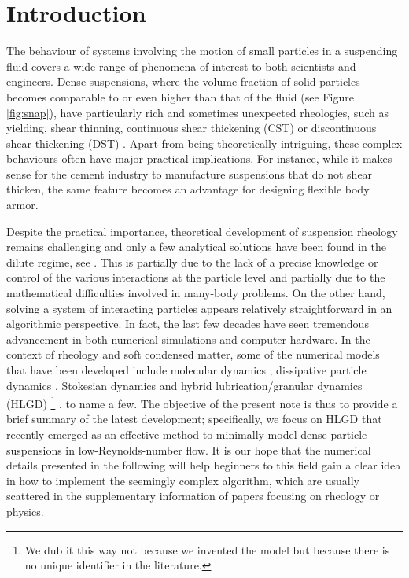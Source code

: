 
\section{Introduction}

The behaviour of systems involving the motion of small particles in a suspending fluid covers a wide range of phenomena of interest to both scientists and engineers. Dense suspensions, where the volume fraction of solid particles becomes comparable to or even higher than that of the fluid (see Figure \ref{fig:snap}), have particularly rich and sometimes unexpected rheologies, such as yielding, shear thinning, continuous shear thickening (CST) or discontinuous shear thickening (DST) \citep{mewis_wagner_book, Morton_Morris_2014, guazzelli_pouliquen_2018, Morris_annurev2020}. Apart from being theoretically intriguing, these complex behaviours often have major practical implications. For instance, while it makes sense for the cement industry to manufacture suspensions that do not shear thicken, the same feature becomes an advantage for designing flexible body armor.

Despite the practical importance, theoretical development of suspension rheology remains challenging and
only a few analytical solutions have been found in the dilute regime, see \eg \cite{Einstein_1906, batchelor_green_1972b}.
This is partially due to the lack of a precise knowledge or control of the various interactions at the particle level and
partially due to the mathematical difficulties involved in many-body problems.
On the other hand, solving a system of interacting particles appears relatively straightforward in an algorithmic perspective.
In fact, the last few decades have seen tremendous advancement in both numerical simulations and computer hardware.
In the context of rheology and soft condensed matter, some of the numerical models that have been developed include
molecular dynamics \citep{Alder_Wainwright_1959,Verlet1967},
dissipative particle dynamics \citep{Hoogerbrugge_1992, Groot_Warren_1997},
Stokesian dynamics \citep{Brady_Bossis1988}
and hybrid lubrication/granular dynamics (HLGD)%
\footnote{We dub it this way not because we invented the model but because there is no unique identifier in the literature.}
\citep{Mari_Seto_2014JoR, Cheal_Ness_2018}, to name a few.
The objective of the present note is thus to provide a brief summary of the latest development;
specifically, we focus on HLGD that recently emerged as an effective method to minimally model dense particle suspensions in low-Reynolds-number flow.
It is our hope that the numerical details presented in the following will help beginners to this field gain a clear idea in how to implement the seemingly complex algorithm, which are usually scattered in the supplementary information of papers focusing on rheology or physics.

